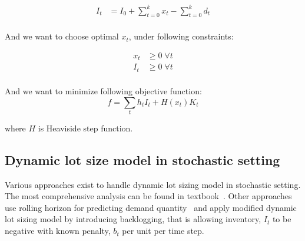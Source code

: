 \begin{align*}
  I_t &= I_0 + \sum_{t=0}^k{x_t} - \sum_{t=0}^k{d_t}\\
\end{align*}

And we want to choose optimal $x_t$, under following constraints:

\begin{align*}
  x_t &\ge 0 \; \forall t\\
  I_t &\ge 0 \; \forall t\\
\end{align*}

And we want to minimize following objective function:
\begin{equation*}
  f = \sum_t{h_t I_t + H(x_t)K_t}
\end{equation*}

where $H$ is Heaviside step function.

\subsection{Dynamic lot size model in stochastic setting}
\label{sub:Dynamic lot size model in stochastic setting}

Various approaches exist to handle dynamic lot sizing model in stochastic setting. The most comprehensive analysis can be found in textbook~\autocite{tempelmeier2013stochastic}. Other approaches use rolling horizon for predicting demand quantity~\autocite{cao2013adaptive} and apply modified dynamic lot sizing model by introducing backlogging, that is allowing inventory, $I_t$ to be negative with known penalty, $b_t$ per unit per time step.
